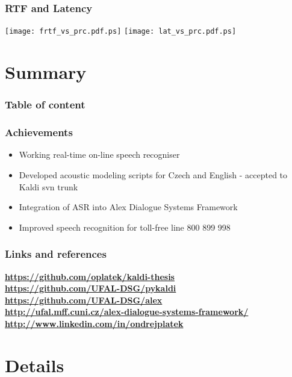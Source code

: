 \begin{frame}\frametitle{RTF and Latency} 
    \texttt{[image: frtf\_vs\_prc.pdf.ps]}
    \texttt{[image: lat\_vs\_prc.pdf.ps]}
\end{frame}


\section{Summary} %

\begin{frame} \frametitle{Table of content} \tableofcontents \end{frame}

\begin{frame}\frametitle{Achievements} 
    \begin{itemize}
        \item Working real-time on-line speech recogniser
        \item Developed acoustic modeling scripts for Czech and English - accepted to Kaldi svn trunk
        \item Integration of ASR into Alex Dialogue Systems Framework
        \item Improved speech recognition for toll-free line 800 899 998
    \end{itemize}
\end{frame}

\begin{frame}\frametitle{Links and references}
\begin{center}
    {\bf \url{https://github.com/oplatek/kaldi-thesis}}\\
    {\bf \url{https://github.com/UFAL-DSG/pykaldi}}\\
    {\bf \url{https://github.com/UFAL-DSG/alex}}\\
    {\bf \url{http://ufal.mff.cuni.cz/alex-dialogue-systems-framework/}}\\
    {\bf \url{http://www.linkedin.com/in/ondrejplatek}}\\
\end{center}
\end{frame}


\section{Details} %


